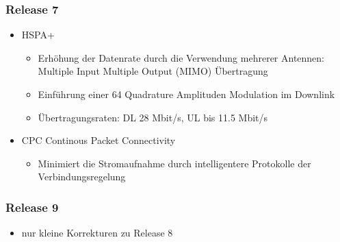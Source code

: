 \begin{minipage}{0.5\linewidth}
\subsubsection{Release 7}
\begin{itemize}
\item HSPA+
\begin{itemize}
\item Erhöhung der Datenrate durch die Verwendung mehrerer Antennen: Multiple Input Multiple Output (MIMO) Übertragung
\item Einführung einer 64 Quadrature Amplituden Modulation im Downlink
\item Übertragungsraten: DL 28 Mbit/s, UL bis 11.5 Mbit/s
\end{itemize}
\item CPC Continous Packet Connectivity
\begin{itemize}
\item Minimiert die Stromaufnahme durch intelligentere Protokolle der Verbindungsregelung
\end{itemize}
\end{itemize}
\subsubsection{Release 9}
\begin{itemize}
\item nur kleine Korrekturen zu Release 8
\end{itemize}
\end{minipage}

